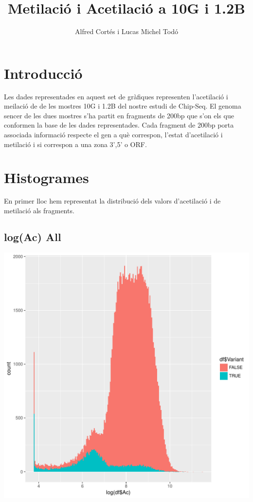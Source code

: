 \documentclass{article}\usepackage[]{graphicx}\usepackage[]{color}
\newenvironment{knitrout}{}{} %
\begin{document}
\title{Metilació i Acetilació a 10G i 1.2B}
\author{Alfred Cortés i Lucas Michel Todó}
\maketitle
\tableofcontents
\clearpage
\section{Introducció}
Les dades representades en aquest set de gràfiques representen l'acetilació i meilació de de les mostres 10G i 1.2B del nostre estudi de Chip-Seq. El genoma sencer de les dues mostres s'ha partit en fragments de 200bp que s'on els que conformen la base de les dades representades. Cada fragment de 200bp porta associada informació respecte el gen a què correspon, l'estat d'acetilació i metilació i si correspon a una zona 3',5' o ORF. 
\clearpage








\section{Histogrames}
En primer lloc hem representat la distribució dels valors d'acetilació i de metilació als fragments.
\subsection{log(Ac) All}
\begin{knitrout}
\color{fgcolor}

{\centering \includegraphics[width=1\linewidth]{figure/minimal-dens_all-1} 

}



\end{knitrout}
\clearpage
\end{document}

